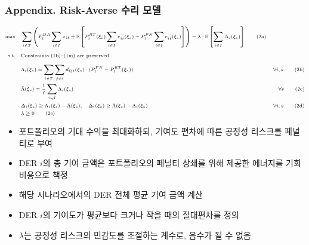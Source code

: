 \documentclass[xcolor=dvipsnames,t,9pt]{beamer}
\begin{document}
{
\begin{frame}[noframenumbering]
    \frametitle{Appendix. Risk-Averse 수리 모델}
    \vspace{-1em}
    \begin{block}{}
        \vspace{-1em}
        \begin{subequations}
            \scriptsize
            \begin{flalign}
                \text{max} \quad
                 & \sum_{t \in T} \left(
                P_t^{DA} \sum_{i \in I} x_{it}
                + \mathbb{E}\left[
                P_t^{RT}(\xi_s) \sum_{i \in I} e^+_{it}(\xi_s)
                - P_t^{PN} \sum_{i \in I} e^-_{it}(\xi_s)
                \right]
                \right)
                - \lambda \cdot \mathbb{E} \left[ \sum_{i \in I} \Delta_i(\xi_s) \right]                                             \tag{2a}                             \\[0.5em]
                \text{s.t.} \quad
                 & \text{Constraints (1b)--(1m) are preserved} \nonumber                                                                                                  \\[0.5em]
                 & \Lambda_i(\xi_s) = \sum_{t \in T} \sum_{j \ne i} d_{ijt}(\xi_s) \cdot (P_t^{PN} - P_t^{RT}(\xi_s))                             & \forall i, s \tag{2b} \\
                 & \bar{\Lambda}(\xi_s) = \frac{1}{I} \sum_{i \in I} \Lambda_i(\xi_s)                                                             & \forall s   \tag{2c}  \\
                 & \Delta_i(\xi_s) \ge \Lambda_i(\xi_s) - \bar{\Lambda}(\xi_s), \quad \Delta_i(\xi_s) \ge \bar{\Lambda}(\xi_s) - \Lambda_i(\xi_s) & \forall i, s \tag{2d} \\
                 & \lambda \ge 0                      \tag{2e}                                                                                    &
            \end{flalign}
        \end{subequations}
    \end{block}
    \small
    \begin{itemize}
        \item[(2a)] 포트폴리오의 기대 수익을 최대화하되, 기여도 편차에 따른 공정성 리스크를 페널티로 부여
        \item[(2b)] DER $i$의 총 기여 금액은 포트폴리오의 페널티 상쇄를 위해 제공한 에너지를 기회비용으로 책정
        \item[(2c)] 해당 시나리오에서의 DER 전체 평균 기여 금액 계산
        \item[(2d)] DER $i$의 기여도가 평균보다 크거나 작을 때의 절대편차를 정의
        \item[(2e)] $\lambda$는 공정성 리스크의 민감도를 조절하는 계수로, 음수가 될 수 없음
    \end{itemize}
\end{frame}
}
\end{document}

